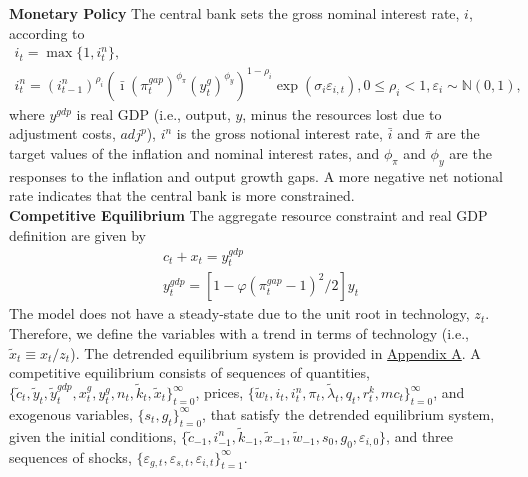 \documentclass[12pt, final]{article}
\begin{document}
\noindent
\textbf{Monetary Policy} The central bank sets the gross nominal interest rate, $i$, according to
\begin{gather}
    \label{eq:15}
    i_t=\max\{1,i_t^n\},\\
      \label{eq:16}
  i_t^n=(i^n_{t-1})^{\rho_i}(\bar{\imath}(\pi^{gap}_t)^{\phi_\pi}(y^{g}_{t})^{\phi_y})^{1-\rho_i}\exp(\sigma_i\varepsilon_{i,t}), 0 \leq \rho_i < 1, \varepsilon_i \sim \mathds{N}(0,1),
  \end{gather}
where $y^{gdp}$ is real GDP (i.e., output, $y$, minus the resources lost due to adjustment costs, $adj^p$), $i^n$ is the gross notional interest rate, $\bar i$ and $\bar{\pi}$ are the target values of the inflation and nominal interest rates, and $\phi_\pi$ and $\phi_y$ are the responses to the inflation and output growth gaps. A more negative net notional rate indicates that the central bank is more constrained.\\

\noindent
\textbf{Competitive Equilibrium} The aggregate resource constraint and real GDP definition are given by
\begin{gather}
  c_t + x_t = y_t^{gdp}\\
  y_t^{gdp} = [1 - \varphi(\pi_t^{gap}-1)^2/2]y_t
\end{gather}
The model does not have a steady-state due to the unit root in technology, $z_t$. Therefore, we define the variables with a trend in terms of technology (i.e., $\tilde{x}_t \equiv x_t/z_t$). The detrended equilibrium system is provided in \hyperlink{Appendix A}{Appendix A}. A competitive equilibrium consists of sequences of quantities, $\{\tilde{c}_t, \tilde{y}_t, \tilde{y}_t^{gdp}, x^g_t, y^g_t, n_t, \tilde{k}_t, \tilde{x}_t\}_{t=0}^\infty$, prices, $\{\tilde{w}_t, i_t, i^n_t, \pi_t, \tilde{\lambda}_t, q_t, r^k_t, mc_t\}_{t=0}^\infty$, and exogenous variables, $\{s_t,g_t\}_{t=0}^\infty$, that satisfy the detrended equilibrium system, given the initial conditions, $\{\tilde{c}_{-1}, i^n_{-1}, \tilde{k}_{-1}, \tilde{x}_{-1}, \tilde{w}_{-1}, s_0, g_0, \varepsilon_{i,0}\}$, and three sequences of shocks, $\{\varepsilon_{g,t}, \varepsilon_{s,t}, \varepsilon_{i,t}\}_{t=1}^\infty$.
\end{document}
